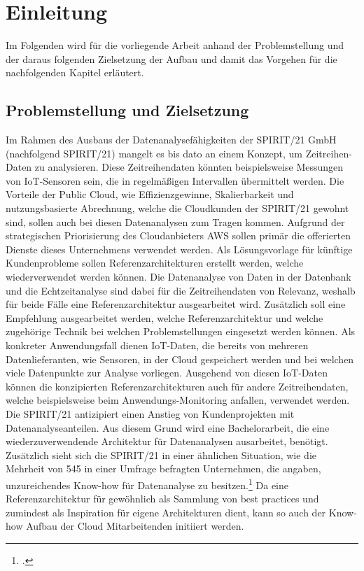 \chapter{Einleitung}
Im Folgenden wird für die vorliegende Arbeit anhand der Problemstellung und der daraus folgenden Zielsetzung der Aufbau und damit das Vorgehen für die nachfolgenden Kapitel erläutert.
\section{Problemstellung und Zielsetzung}
Im Rahmen des Ausbaus der Datenanalysefähigkeiten der SPIRIT/21 GmbH (nachfolgend SPIRIT/21) mangelt es bis dato an einem Konzept, um
Zeitreihen-Daten zu analysieren. 
Diese Zeitreihendaten könnten beispielsweise Messungen von \acf{IoT}-Sensoren sein, die in regelmäßigen Intervallen übermittelt werden. Die Vorteile der Public Cloud, wie Effizienzgewinne, Skalierbarkeit und nutzungsbasierte Abrechnung, welche die Cloudkunden der SPIRIT/21 gewohnt sind, sollen auch bei diesen Datenanalysen zum Tragen kommen. 
Aufgrund der strategischen Priorisierung des Cloudanbieters \acf{AWS} sollen primär die offerierten Dienste dieses Unternehmens verwendet werden.
Als Lösungsvorlage für künftige Kundenprobleme sollen Referenzarchitekturen erstellt werden, welche wiederverwendet werden können. 
Die Datenanalyse von Daten in der Datenbank und die Echtzeitanalyse sind dabei für die
Zeitreihendaten von Relevanz, weshalb für beide Fälle eine Referenzarchitektur ausgearbeitet wird.
Zusätzlich soll eine Empfehlung ausgearbeitet werden, welche Referenzarchitektur und welche
zugehörige Technik bei welchen Problemstellungen eingesetzt werden können. Als konkreter Anwendungsfall dienen \ac{IoT}-Daten, die bereits von mehreren Datenlieferanten, wie Sensoren, in der Cloud gespeichert werden und bei welchen viele Datenpunkte zur Analyse vorliegen. Ausgehend von diesen \ac{IoT}-Daten können die konzipierten Referenzarchitekturen auch für andere Zeitreihendaten, welche beispielsweise beim Anwendungs-Monitoring anfallen, verwendet werden. 
Die SPIRIT/21 antizipiert einen Anstieg von Kundenprojekten mit Datenanalyseanteilen. Aus diesem Grund wird eine Bachelorarbeit, die eine wiederzuverwendende Architektur für Datenanalysen ausarbeitet, benötigt. Zusätzlich sieht sich die SPIRIT/21 in einer ähnlichen Situation, wie die Mehrheit von 545 in einer Umfrage befragten Unternehmen, die angaben, unzureichendes Know-how für Datenanalyse zu besitzen.\footcite[Vgl.][]{o.V..o.J.} Da eine Referenzarchitektur für gewöhnlich als Sammlung von best practices und zumindest als Inspiration für eigene Architekturen dient, kann so auch der Know-how Aufbau der Cloud Mitarbeitenden initiiert werden.

